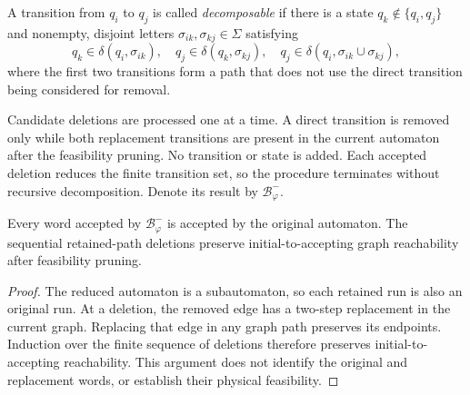 \begin{definition}
\label{ch04:def:decomposable-transition}
\begin{revision}
A transition from $q_i$ to $q_j$ is called \emph{decomposable} if
there is a state $q_k\notin\{q_i,q_j\}$ and nonempty, disjoint letters
$\sigma_{ik},\sigma_{kj}\in\Sigma$ satisfying
\begin{equation}
\label{ch04:eq:decomposable_transition}
q_k\in\delta(q_i,\sigma_{ik}),\quad
q_j\in\delta(q_k,\sigma_{kj}),\quad
q_j\in\delta(q_i,\sigma_{ik}\cup\sigma_{kj}),
\end{equation}
where the first two transitions form a path that does not use the direct
transition being considered for removal.
\end{revision}
\end{definition}

\begin{revision}
Candidate deletions are processed one at a time. A direct transition is
removed only while both replacement transitions are present in the current
automaton after the feasibility pruning. No transition or state is added.
Each accepted deletion reduces the finite transition set, so the procedure
terminates without recursive decomposition. Denote its result by
$\mathcal{B}_{\varphi}^{-}$.
\end{revision}

\begin{revision}
\begin{lemma}
\label{ch04:lemma:pruned_nba_equiv}
Every word accepted by $\mathcal{B}_{\varphi}^{-}$ is accepted by the
original automaton. The sequential retained-path deletions preserve
initial-to-accepting graph reachability after feasibility pruning.
\end{lemma}
\begin{proof}
The reduced automaton is a subautomaton, so each retained run is also an
original run. At a deletion, the removed edge has a two-step replacement
in the current graph. Replacing that edge in any graph path preserves its
endpoints. Induction over the finite sequence of deletions therefore
preserves initial-to-accepting reachability. This argument does not identify
the original and replacement words, or establish their physical feasibility.
\end{proof}
\end{revision}

\begin{example}
\label{ch04:example:prune_nba}
\end{example}

